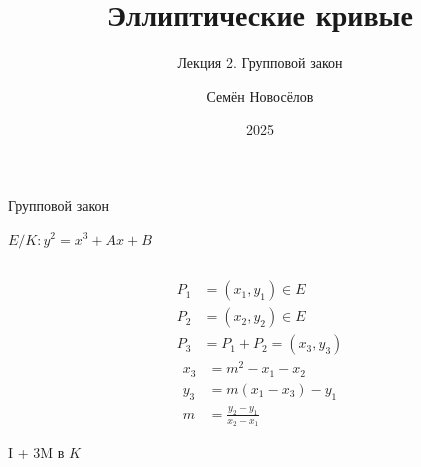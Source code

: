 \documentclass{beamer}
\title{Эллиптические кривые}
\subtitle{Лекция 2. Групповой закон}
\author{Семён Новосёлов}
\institute{БФУ им. И. Канта}
\date{2025}
\begin{document}
	
	\frame{\titlepage}
	
	\begin{frame}{Групповой закон}%
		\begin{center}
			$E/K: y^2 = x^3 + Ax + B$
		\end{center}
		\begin{columns}
			\begin{column}{0.5\textwidth}
				\begin{equation*}
					\begin{split}
						P_1 &= (x_1, y_1) \in E \\
						P_2 &= (x_2, y_2) \in E \\
						P_3 &= P_1 + P_2 = \left(x_3, y_3\right)
					\end{split}
				\end{equation*}
				\begin{equation*}
					\begin{split}
						x_3 &= m^2 - x_1 - x_2 \\
						y_3 &= m\left( x_1 - x_3 \right) - y_1 \\
						m &= \frac{y_2 - y_1}{x_2 - x_1}
					\end{split}
				\end{equation*}
				\begin{center}
					\begin{tcolorbox}[enhanced,hbox,colback=box-blue-color!15,colframe=box-blue-color,title=Сложность,center title]
						\begin{varwidth}{\textwidth}
							\begin{center}
								I + $3$M в $K$
							\end{center}
						\end{varwidth}
					\end{tcolorbox}	
				\end{center}
				

\end{column}
\end{columns}
\end{frame}
\end{document}
